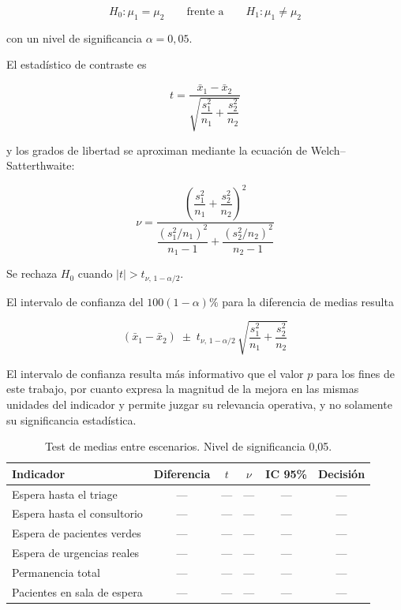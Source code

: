\[
H_0: \mu_1 = \mu_2
\qquad\text{frente a}\qquad
H_1: \mu_1 \neq \mu_2
\]

con un nivel de significancia $\alpha = 0{,}05$.

El estadístico de contraste es

\begin{equation}
t = \frac{\bar{x}_1 - \bar{x}_2}
         {\sqrt{\dfrac{s_1^2}{n_1} + \dfrac{s_2^2}{n_2}}}
\label{eq:t}
\end{equation}

y los grados de libertad se aproximan mediante la ecuación de
Welch--Satterthwaite:

\begin{equation}
\nu = \frac{\left(\dfrac{s_1^2}{n_1} + \dfrac{s_2^2}{n_2}\right)^{\!2}}
           {\dfrac{\left(s_1^2/n_1\right)^2}{n_1 - 1} +
            \dfrac{\left(s_2^2/n_2\right)^2}{n_2 - 1}}
\label{eq:welch}
\end{equation}

Se rechaza $H_0$ cuando $|t| > t_{\nu,\,1-\alpha/2}$.

El intervalo de confianza del $100(1-\alpha)\%$ para la diferencia de medias
resulta

\begin{equation}
(\bar{x}_1 - \bar{x}_2) \;\pm\;
t_{\nu,\,1-\alpha/2}\,
\sqrt{\frac{s_1^2}{n_1} + \frac{s_2^2}{n_2}}
\label{eq:ic}
\end{equation}

El intervalo de confianza resulta más informativo que el valor $p$ para los
fines de este trabajo, por cuanto expresa la magnitud de la mejora en las
mismas unidades del indicador y permite juzgar su relevancia operativa, y no
solamente su significancia estadística.

\begin{table}[H]
\centering
\small
\begin{tabular}{lccccc}
\toprule
\textbf{Indicador} & \textbf{Diferencia} & $t$ & $\nu$ & \textbf{IC 95\%} & \textbf{Decisión} \\
\midrule
Espera hasta el triage      & --- & --- & --- & --- & --- \\
Espera hasta el consultorio & --- & --- & --- & --- & --- \\
Espera de pacientes verdes  & --- & --- & --- & --- & --- \\
Espera de urgencias reales  & --- & --- & --- & --- & --- \\
Permanencia total           & --- & --- & --- & --- & --- \\
Pacientes en sala de espera & --- & --- & --- & --- & --- \\
\bottomrule
\end{tabular}
\caption{Test de medias entre escenarios. Nivel de significancia 0,05.}
\label{tab:test}
\end{table}

